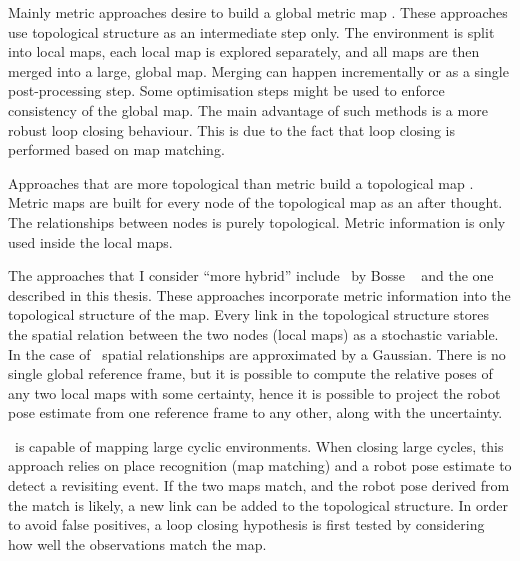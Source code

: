 Mainly metric approaches desire to build a global metric map
\cite{Thrun98a, slam_thrun98b}. These approaches use topological
structure as an intermediate step only. The environment is split into
local maps, each local map is explored separately, and all maps are
then merged into a large, global map. Merging can happen incrementally
or as a single post-processing step. Some optimisation steps might be
used to enforce consistency of the global map. The main advantage of
such methods is a more robust loop closing behaviour. This is due to
the fact that loop closing is performed based on map matching.

Approaches that are more topological than metric build a topological
map \cite{Cho01,Kuipers00}. Metric maps are built for every node of
the topological map as an after thought. The relationships between
nodes is purely topological. Metric information is only used inside
the local maps.

The approaches that I consider ``more hybrid'' include \Atlas\ by
Bosse \etal\ \cite{bosse02atlas} and the one described in this thesis.
These approaches incorporate metric information into the topological
structure of the map. Every link in the topological structure stores
the spatial relation between the two nodes (local maps) as a
stochastic variable. In the case of \Atlas\ spatial relationships are
approximated by a Gaussian. There is no single global reference
frame, but it is possible to compute the relative poses of any two
local maps with some certainty, hence it is possible to project the
robot pose estimate from one reference frame to any other, along with
the uncertainty.

\Atlas\ is capable of mapping large cyclic environments. When closing
large cycles, this approach relies on place recognition (map matching)
and a robot pose estimate to detect a revisiting event. If the two
maps match, and the robot pose derived from the match is likely, a new
link can be added to the topological structure. In order to avoid
false positives, a loop closing hypothesis is first tested by
considering how well the observations match the map.


\nocite{tim_bailey,
thrun00,
dissanayake01,
SOG-Slam01,
guivant02:_simul,
guivant02:_solvin,
thrun02:_robot_mappin,
 zunino01:_simul,
 JensfeltKristensen01,
 JensfeltWijkAustin00a,
 JensfeltAustinWijk00b,
 anguelov02,
 hahnel02:_map,
 burgard99:_exper,
 schulz01:_track_multip_movin_objec_mobil_robot,
 castellanos99:_spmap,
 castellanos01:_multis,
 dudek00:_robus_place_recog_local_appear_method,
 konolige99:_increm_mappin_large_cyclic_envir,
 lu97:_global,
 gutmann96:_amos,
 williams:icra2002,
 williams:acra2001,
 Zimmer96,
 slam_kuiper91,
 slam_kuipers88,
 Thrun00j,
 Fox99,
 Cox91,
 Borenstein96,
 kk2002,
 sidenbladh00stochastic,
 Cox94,
 Thrun02h,
 Bennewitz02a,
 Liu01a,
 Dellaert00c,
 nieto2003, 
 konolige99,
 doucetraoblackwellised,
 guivant03,
 newman03,
 vandermerwe00_tr,
 vandermerwe2000,
 wan01unscented,
 unscented,
 Margaret_hybrid_maps,
 kuipers1978,
 KuipersLevitt88,
 Kuipers00,
 Buzan04,
 uhlmann97nondivergent,
 julier97new,
 julier96general,
 julier99scaled,
 doucet98sequential,
 DA_Lazy,
 Kuipers2004,
 kk2004}



